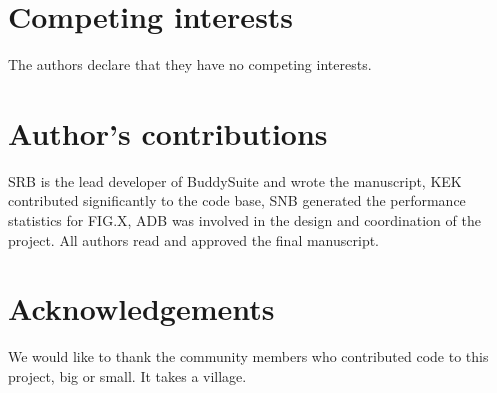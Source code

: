 \documentclass[twocolumn]{bmcart}%
\begin{document}
\begin{backmatter}

\section*{Competing interests}
  The authors declare that they have no competing interests.

\section*{Author's contributions}
  SRB is the lead developer of BuddySuite and wrote the manuscript, KEK contributed significantly to the code base, SNB generated the performance statistics for FIG.X, ADB was involved in the design and coordination of the project. All authors read and approved the final manuscript.

\section*{Acknowledgements}
  We would like to thank the community members who contributed code to this project, big or small. It takes a village.





\end{backmatter}
\end{document}
